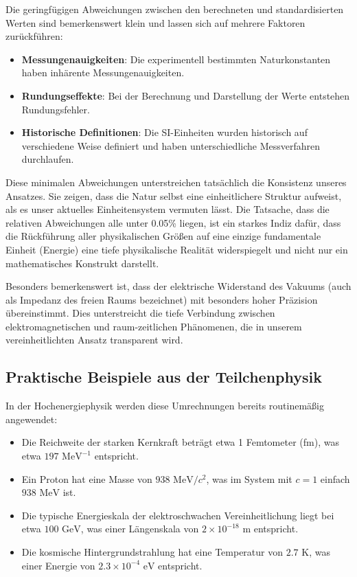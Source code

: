 \documentclass{article}
\begin{document}
	Die geringfügigen Abweichungen zwischen den berechneten und standardisierten Werten sind bemerkenswert klein und lassen sich auf mehrere Faktoren zurückführen:
	
	\begin{itemize}
		\item \textbf{Messungenauigkeiten}: Die experimentell bestimmten Naturkonstanten haben inhärente Messungenauigkeiten.
		\item \textbf{Rundungseffekte}: Bei der Berechnung und Darstellung der Werte entstehen Rundungsfehler.
		\item \textbf{Historische Definitionen}: Die SI-Einheiten wurden historisch auf verschiedene Weise definiert und haben unterschiedliche Messverfahren durchlaufen.
	\end{itemize}
	
	Diese minimalen Abweichungen unterstreichen tatsächlich die Konsistenz unseres Ansatzes. Sie zeigen, dass die Natur selbst eine einheitlichere Struktur aufweist, als es unser aktuelles Einheitensystem vermuten lässt. Die Tatsache, dass die relativen Abweichungen alle unter 0.05\% liegen, ist ein starkes Indiz dafür, dass die Rückführung aller physikalischen Größen auf eine einzige fundamentale Einheit (Energie) eine tiefe physikalische Realität widerspiegelt und nicht nur ein mathematisches Konstrukt darstellt.
	
	Besonders bemerkenswert ist, dass der elektrische Widerstand des Vakuums (auch als Impedanz des freien Raums bezeichnet) mit besonders hoher Präzision übereinstimmt. Dies unterstreicht die tiefe Verbindung zwischen elektromagnetischen und raum-zeitlichen Phänomenen, die in unserem vereinheitlichten Ansatz transparent wird.
	
	
	\subsection{Praktische Beispiele aus der Teilchenphysik}
	
	In der Hochenergiephysik werden diese Umrechnungen bereits routinemäßig angewendet:
	
	\begin{itemize}
		\item Die Reichweite der starken Kernkraft beträgt etwa 1 Femtometer (fm), was etwa $197 \text{ MeV}^{-1}$ entspricht.
		\item Ein Proton hat eine Masse von $938 \text{ MeV}/c^2$, was im System mit $c = 1$ einfach $938 \text{ MeV}$ ist.
		\item Die typische Energieskala der elektroschwachen Vereinheitlichung liegt bei etwa $100 \text{ GeV}$, was einer Längenskala von $2 \times 10^{-18} \text{ m}$ entspricht.
		\item Die kosmische Hintergrundstrahlung hat eine Temperatur von $2.7 \text{ K}$, was einer Energie von $2.3 \times 10^{-4} \text{ eV}$ entspricht.
	\end{itemize}
	
\end{document}
